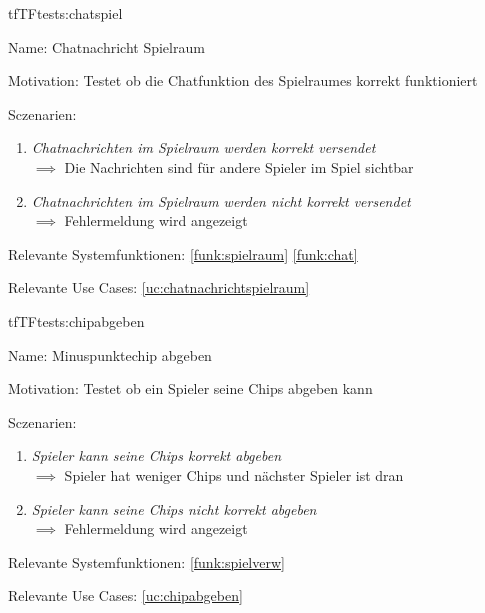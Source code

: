 \begin{description}[leftmargin=5em, style=sameline]

\begin{lhp}{tf}{TF}{tests:chatspiel}
	\item [Name:] Chatnachricht Spielraum
	\item [Motivation:] Testet ob die Chatfunktion des Spielraumes korrekt funktioniert
	\item [Sczenarien:] \hfill
		\begin{enumerate}
			\item \textit{Chatnachrichten im Spielraum werden korrekt versendet } \\ $\implies$ Die Nachrichten sind für andere Spieler im Spiel sichtbar
			
			\item \textit{Chatnachrichten im Spielraum werden nicht korrekt versendet } \\ $\implies$ Fehlermeldung wird angezeigt
			
		\end{enumerate}
	\item [Relevante Systemfunktionen:] \ref{funk:spielraum} \ref{funk:chat}
	\item [Relevante Use Cases:] \ref{uc:chatnachrichtspielraum}
\end{lhp}

\end{description}






\begin{description}[leftmargin=5em, style=sameline]

\begin{lhp}{tf}{TF}{tests:chipabgeben}
	\item [Name:] Minuspunktechip abgeben
	\item [Motivation:] Testet ob ein Spieler seine Chips abgeben kann
	\item [Sczenarien:] \hfill
		\begin{enumerate}
			\item \textit{ Spieler kann seine Chips korrekt abgeben} \\ $\implies$ Spieler hat weniger Chips und nächster Spieler ist dran
			
			\item \textit{Spieler kann seine Chips nicht korrekt abgeben } \\ $\implies$ Fehlermeldung wird angezeigt
			
			
		\end{enumerate}
	\item [Relevante Systemfunktionen:] \ref{funk:spielverw}
	\item [Relevante Use Cases:] \ref{uc:chipabgeben}
\end{lhp}

\end{description}







